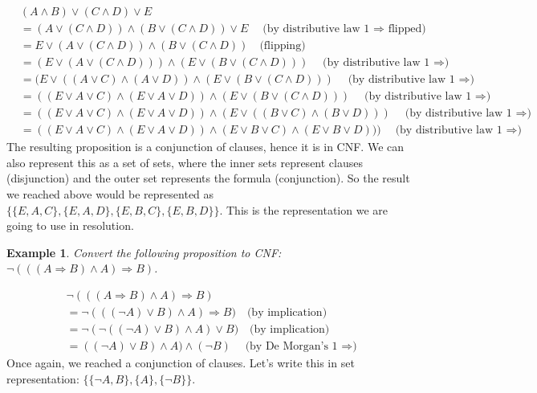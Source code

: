 \documentclass[10pt]{article}
\newtheorem{problem}{Example}
\newenvironment{solution}[1][\emph{Solution:}]{\begin{trivlist}
\item[\hskip \labelsep {\bfseries #1}]}{\end{trivlist}}
\newcommand{\imp}{\ensuremath{\Rightarrow}}
\newcommand{\set}[1]{\{#1\}}
\begin{document}
\begin{solution}
\begin{align*}
& (A \land B) \lor (C \land D) \lor E\\
&= (A \lor (C \land D)) \land (B \lor (C \land D)) \lor E \quad\text{(by distributive law 1 $\imp$ flipped)}\\
&= E \lor (A \lor (C \land D)) \land (B \lor (C \land D)) \quad\text{(flipping)}\\
&= (E \lor (A \lor (C \land D))) \land (E \lor (B \lor (C \land D))) \quad\text{(by distributive law 1 $\imp$)}\\
&= (E \lor ((A \lor C) \land (A \lor D)) \land (E \lor (B \lor (C \land D))) \quad\text{(by distributive law 1 $\imp$)}\\
&= ((E \lor A \lor C) \land (E \lor A \lor D)) \land (E \lor (B \lor (C \land D))) \quad\text{(by distributive law 1 $\imp$)}\\
&= ((E \lor A \lor C) \land (E \lor A \lor D)) \land (E \lor ((B \lor C) \land (B \lor D))) \quad\text{(by distributive law 1 $\imp$)}\\
&= ((E \lor A \lor C) \land (E \lor A \lor D)) \land (E \lor B \lor C) \land (E \lor B \lor D))) \quad\text{(by distributive law 1 $\imp$)}
\end{align*}
The resulting proposition is a conjunction of clauses, hence it is in CNF. We can also represent this as a set of sets, where the inner sets represent clauses (disjunction) and the outer set represents the formula (conjunction). So the result we reached above would be represented as $\set{\set{E,A,C}, \set{E,A,D}, \set{E,B,C}, \set{E,B,D}}$. This is the representation we are going to use in resolution.
\end{solution}

\begin{problem}
Convert the following proposition to CNF: $\lnot (((A \imp B) \land A) \imp B)$.
\end{problem}
\begin{solution}
\begin{align*}
& \lnot (((A \imp B) \land A) \imp B)\\
&= \lnot (((\lnot A) \lor B) \land A) \imp B) \quad\text{(by implication)}\\
&= \lnot (\lnot ((\lnot A) \lor B) \land A) \lor B) \quad\text{(by implication)}\\
&= ((\lnot A) \lor B) \land A) \land (\lnot B) \quad\text{(by De Morgan's 1 $\imp$)}
\end{align*}
Once again, we reached a conjunction of clauses. Let's write this in set representation: $\set{\set{\lnot A, B}, \set{A}, \set{\lnot B}}$.
\end{solution}
\end{document}
